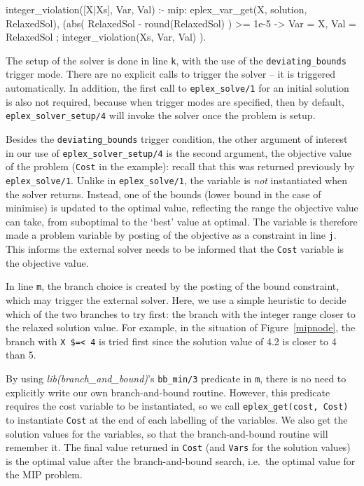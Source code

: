 {\begin{code}
integer_violation([X|Xs], Var, Val) :-
        mip: eplex_var_get(X, solution, RelaxedSol),
        (abs( RelaxedSol - round(RelaxedSol) ) >= 1e-5 ->
            Var = X, Val = RelaxedSol
        ;
            integer_violation(Xs, Var, Val)
        ).

\end{code}}

The setup of the solver is done in line \verb'k', with the use of the
\verb'deviating_bounds' trigger mode. There are no explicit calls to trigger the
solver -- it is triggered automatically. In addition, the first call to
\verb'eplex_solve/1' for an initial solution
is also not required, because when trigger modes are specified, then
by default, \verb'eplex_solver_setup/4' will invoke the solver once the
problem is setup. 

\begin{sloppypar}
Besides the \verb'deviating_bounds'
trigger condition, the other argument of interest in our use of
\verb'eplex_solver_setup/4' is the second argument,
the objective value of the problem (\verb'Cost' in the example): 
recall that this was returned previously by \verb'eplex_solve/1'.
Unlike in \verb'eplex_solve/1', the variable is {\it not\/}
instantiated when the solver returns. Instead, one of the bounds (lower
bound in the case of minimise) is updated
to the optimal value, reflecting the range the objective value can take,
from suboptimal to the `best' value at optimal. The variable is therefore
made a problem variable by posting of the objective as a constraint in line
\verb'j'. This informs the external solver needs to be informed
that the \verb'Cost' variable is the objective value.

\end{sloppypar}

In line \verb'm', the branch choice is created by the posting of the bound
constraint, which may trigger the external solver. Here, we use a
simple heuristic to decide which of the two branches to try first: the
branch with the integer range closer to the relaxed solution value.
For example, in the situation of Figure~\ref{mipnode}, the branch with
\verb'X $=< 4' is tried first since the solution value of 4.2 is
closer to 4 than 5.

By using {\it lib(branch_and_bound)\/}'s \verb'bb_min/3' predicate in \verb'm',  
there is no need to explicitly write our own branch-and-bound routine. However, 
this predicate requires the cost variable to be instantiated, so we call
\verb'eplex_get(cost, Cost)' to instantiate \verb'Cost' at the end of
each labelling of the variables. We also get the solution values for the
variables, so that the branch-and-bound routine will remember it.
The final value returned in \verb'Cost' (and {\tt Vars} for the solution
values) 
is the optimal value after the branch-and-bound search, i.e.\ the
optimal value for the MIP problem.

